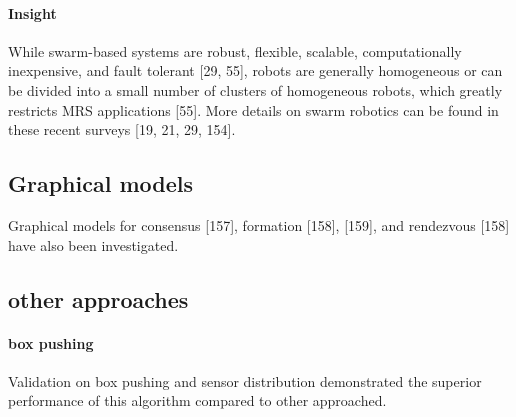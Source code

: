 \documentclass{article}
\begin{document}
   		\paragraph{Insight} 
  	    While swarm-based systems are robust, flexible, scalable, computationally inexpensive, and fault tolerant \citet{rizk-2019-cooperative-heterogeneous-multi-robot-systems-a-survey}[29, 55], robots are generally homogeneous or can be divided into a small number of clusters of homogeneous robots, which greatly restricts MRS applications \citet{rizk-2019-cooperative-heterogeneous-multi-robot-systems-a-survey}[55]. More details on
		   		swarm robotics can be found in these recent surveys \citet{rizk-2019-cooperative-heterogeneous-multi-robot-systems-a-survey}[19, 21, 29, 154].
   		
   		\subsection{Graphical models}
   		Graphical models for consensus \citet{rizk-2018-decision-making-in-multiagent-systems-a-survey}[157], formation \citet{rizk-2018-decision-making-in-multiagent-systems-a-survey}[158], [159], and rendezvous \citet{rizk-2018-decision-making-in-multiagent-systems-a-survey}[158] have also been investigated.
   		
   		\subsection{other approaches} 
   		\paragraph{box pushing} Validation on box pushing and sensor distribution demonstrated the superior performance of this algorithm compared to other approached. 
   		
\end{document}
